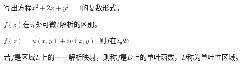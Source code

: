 \documentclass{exam}
\begin{document}
\begin{questions}
\question
写出方程$x^2+2x+y^2=1$的复数形式。
\vspace*{1in}

\question
$f(z)$在$z_0$处可微/解析的区别。
\vspace*{1in}

\question
$f(z)=u(x,y)+iv(x,y)$, 则$f$在$z_0$处

\newpage
\question
若$f$是区域$D$上的一一解析映射，则称$f$是$D$上的单叶函数，$D$称为单叶性区域。
\end{questions}
\end{document}
